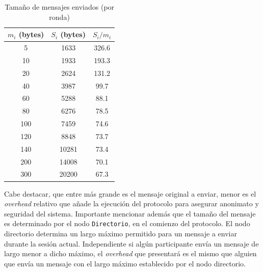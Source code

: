 \begin{table}[h!]
\centering
\begin{tabular}[h!]{|c|c|c|}
\hline
$m_i$ (bytes) & $S_i$ (bytes) & $S_i / m_i$ \\ \hline
5                                   & 1633                               & 326.6       \\ \hline
10                                  & 1933                               & 193.3       \\ \hline
20                                  & 2624                               & 131.2       \\ \hline
40                                  & 3987                               & 99.7        \\ \hline
60                                  & 5288                               & 88.1        \\ \hline
80                                  & 6276                               & 78.5        \\ \hline
100                                 & 7459                               & 74.6        \\ \hline
120                                 & 8848                               & 73.7        \\ \hline
140                                 & 10281                              & 73.4        \\ \hline
200                                 & 14008                              & 70.1        \\ \hline
300                                 & 20200                              & 67.3        \\ \hline
\end{tabular}
\caption{Tamaño de mensajes enviados (por ronda)}
\label{table:message_sizes_table}
\end{table}

Cabe destacar, que entre más grande es el mensaje original a enviar, menor es 
el \emph{overhead} relativo que añade la ejecución del protocolo para asegurar 
anonimato y seguridad del sistema. Importante mencionar además que el tamaño 
del mensaje es determinado por el nodo \texttt{Directorio}, en el comienzo del 
protocolo. El nodo directorio determina un largo máximo permitido para un 
mensaje a enviar durante la sesión actual. Independiente si algún participante 
envía un mensaje de largo menor a dicho máximo, el \emph{overhead} que 
presentará es el mismo que alguien que envía un mensaje con el largo máximo 
establecido por el nodo directorio.

